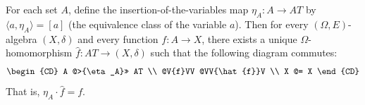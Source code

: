 For each set $A$, define the insertion-of-the-variables map $\eta_A: A \longrightarrow AT$ by $\langle a, \eta_A \rangle = [a]$ (the equivalence class of the variable $a$). Then for every $(\Omega, E)$-algebra $(X, \delta)$ and every function $f: A \longrightarrow X$, there exists a unique $\Omega$-homomorphism $\hat{f}: AT \longrightarrow (X, \delta)$ such that the following diagram commutes:
\[
\begin{CD}
A @>{\eta_A}>> AT \\
@V{f}VV @VV{\hat{f}}V \\
X @= X
\end{CD}
\]
That is, $\eta_A \cdot \hat{f} = f$.
